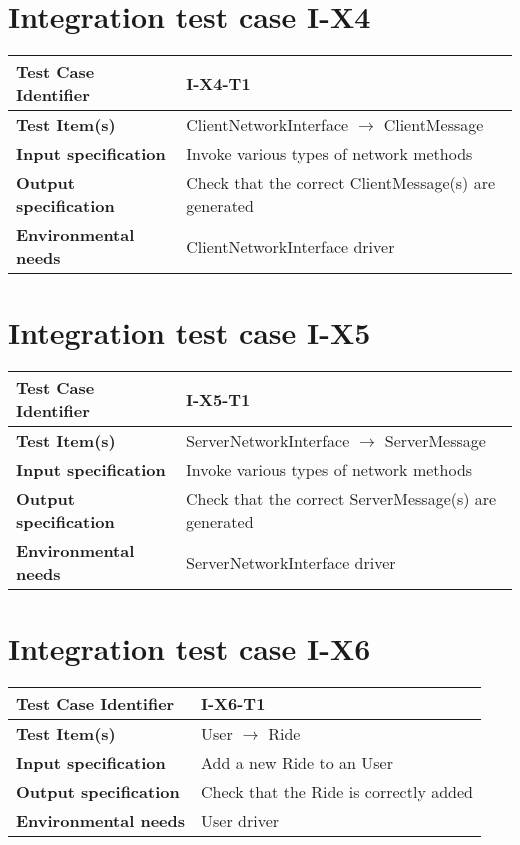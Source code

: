 
\section{Integration test case I-X4}
\begin{tabular*}{1.23\textwidth}{ l l }
 \textbf{Test Case Identifier}		& I-X4-T1 \\
 \hline
 \textbf{Test Item(s)}			& ClientNetworkInterface $\rightarrow$ ClientMessage \\
 \hline
 \textbf{Input specification}		& Invoke various types of network methods \\
 \hline
 \textbf{Output specification}		& Check that the correct ClientMessage(s) are generated \\
 \hline
 \textbf{Environmental needs}		& ClientNetworkInterface driver \\
\end{tabular*}

\section{Integration test case I-X5}
\begin{tabular*}{1.23\textwidth}{ l l }
 \textbf{Test Case Identifier}		& I-X5-T1 \\
 \hline
 \textbf{Test Item(s)}			& ServerNetworkInterface $\rightarrow$ ServerMessage \\
 \hline
 \textbf{Input specification}		& Invoke various types of network methods \\
 \hline
 \textbf{Output specification}		& Check that the correct ServerMessage(s) are generated \\
 \hline
 \textbf{Environmental needs}		& ServerNetworkInterface driver \\
\end{tabular*}

\section{Integration test case I-X6}
\begin{tabular*}{1.23\textwidth}{ l l }
 \textbf{Test Case Identifier}		& I-X6-T1 \\
 \hline
 \textbf{Test Item(s)}			& User $\rightarrow$ Ride \\
 \hline
 \textbf{Input specification}		& Add a new Ride to an User \\
 \hline
 \textbf{Output specification}		& Check that the Ride is correctly added \\
 \hline
 \textbf{Environmental needs}		& User driver \\
\end{tabular*}

